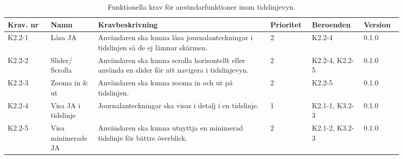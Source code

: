 \documentclass{article}
\begin{document}
\begin{table}[H]
    \caption{Funktionella krav för användarfunktioner inom tidslinjevyn.} 
    \label{tab:användar_funktioner}
    \centering
    \begin{tabular}{|p{0.1\linewidth}|p{0.1\linewidth}|p{0.4\linewidth}|p{0.09\linewidth}|p{0.12\linewidth}|p{0.09\linewidth}|}
        \hline
        \textbf{Krav. nr} & \textbf{Namn} & \textbf{Kravbeskrivning} & \textbf{Prioritet} & \textbf{Beroenden}  & \textbf{Version} \\ \hline
        K2.2-1 & Låsa JA & Användaren ska kunna låsa journalanteckningar i tidslinjen så de ej lämnar skärmen. & 2 & K2.2-4 &0.1.0 \\ \hline
        K2.2-2 & Slider/ Scrolla & Användaren ska kunna scrolla horisontellt eller använda en slider för att navigera i tidslinjevyn. & 2 & K2.2-4, K2.2-5 & 0.1.0\\ \hline
        K2.2-3 & Zooma in \& ut & Användaren ska kunna zooma in och ut på tidslinjen. & 2 & K2.2-5 & 0.1.0\\ \hline
        K2.2-4 & Visa JA i tidslinje & Journalanteckningar ska visas i detalj i en tidslinje. & 1 & K2.1-1, K3.2-3 & 0.1.0\\ \hline
        K2.2-5 & Visa minimerade JA & Användaren ska kunna utnyttja en minimerad tidslinje för bättre överblick. & 2 & K2.1-2, K3.2-3 & 0.1.0\\ \hline
    \end{tabular}
\end{table}
\end{document}
